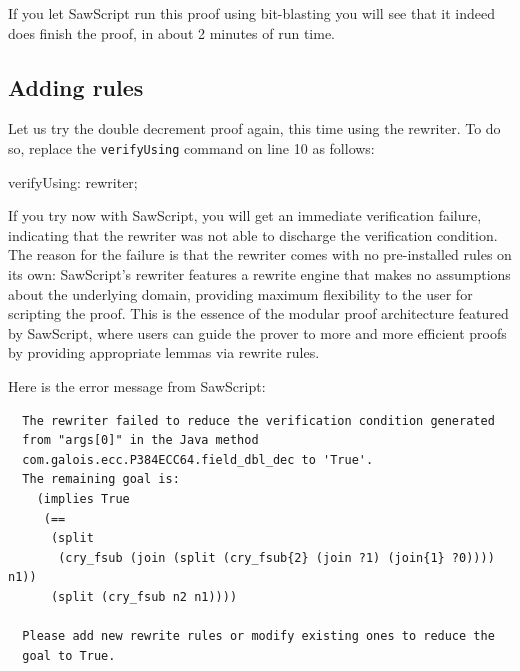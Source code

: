 \documentclass[12pt]{galois-whitepaper}
\newcommand{\sawScript}{{\sc SawScript}\xspace}
\begin{document}
If you let \sawScript run this proof using bit-blasting you will
see that it indeed does finish the proof, in about 2 minutes of run time.

\subsection{Adding rules}
Let us try the double decrement proof again, this time using the rewriter. To do so, replace the
{\tt verifyUsing} command on line 10 as follows:

\begin{code}
   verifyUsing: rewriter;
\end{code}

If you try now with \sawScript, you will get an immediate verification failure, indicating that the rewriter was not able to discharge
the verification condition. The reason for the failure is that the rewriter comes with no pre-installed rules on its own: \sawScript's
rewriter features a rewrite engine that makes no assumptions about the underlying domain, providing maximum flexibility to the user
for scripting the proof. This is the essence of the modular proof architecture featured by \sawScript, where users can guide the prover
to more and more efficient proofs by providing appropriate lemmas via rewrite rules.

Here is the error message from \sawScript:
\begin{Verbatim}
  The rewriter failed to reduce the verification condition generated
  from "args[0]" in the Java method
  com.galois.ecc.P384ECC64.field_dbl_dec to 'True'.
  The remaining goal is:
    (implies True
     (==
      (split
       (cry_fsub (join (split (cry_fsub{2} (join ?1) (join{1} ?0)))) n1))
      (split (cry_fsub n2 n1))))

  Please add new rewrite rules or modify existing ones to reduce the
  goal to True.
\end{Verbatim}
\end{document}

